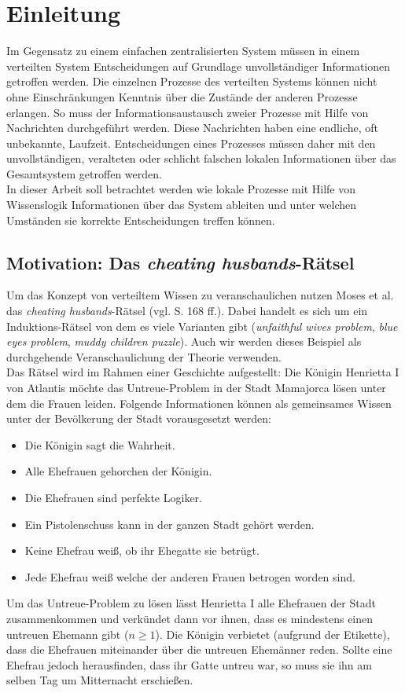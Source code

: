 \section{Einleitung}
Im Gegensatz zu einem einfachen zentralisierten System müssen in einem verteilten System Entscheidungen auf Grundlage unvollständiger Informationen getroffen werden.
Die einzelnen Prozesse des verteilten Systems können nicht ohne Einschränkungen Kenntnis über die Zustände der anderen Prozesse erlangen.
So muss der Informationsaustausch zweier Prozesse mit Hilfe von Nachrichten durchgeführt werden. Diese Nachrichten haben eine endliche, oft unbekannte, Laufzeit.
Entscheidungen eines Prozesses müssen daher mit den unvollständigen, veralteten oder schlicht falschen lokalen Informationen über das Gesamtsystem getroffen werden.\\
In dieser Arbeit soll betrachtet werden wie lokale Prozesse mit Hilfe von Wissenslogik Informationen über das System ableiten und unter welchen Umständen sie korrekte Entscheidungen treffen können.

\subsection{Motivation: Das \textit{cheating husbands}-Rätsel}
\label{motivation}
Um das Konzept von verteiltem Wissen zu veranschaulichen nutzen Moses et al. \cite{moses1986cheating} das \textit{cheating husbands}-Rätsel (vgl. \cite{moses1986cheating} S. 168 ff.).
Dabei handelt es sich um ein Induktions-Rätsel von dem es viele Varianten gibt (\textit{unfaithful wives problem}, \textit{blue eyes problem}, \textit{muddy children puzzle}). Auch wir werden dieses Beispiel als durchgehende Veranschaulichung der Theorie verwenden.\\
Das Rätsel wird im Rahmen einer Geschichte aufgestellt: Die Königin Henrietta I von Atlantis möchte das Untreue-Problem in der Stadt Mamajorca lösen unter dem die Frauen leiden.
Folgende Informationen können als gemeinsames Wissen unter der Bevölkerung der Stadt vorausgesetzt werden:
\begin{itemize}
	\item Die Königin sagt die Wahrheit.
	\item Alle Ehefrauen gehorchen der Königin.
	\item Die Ehefrauen sind perfekte Logiker.
	\item Ein Pistolenschuss kann in der ganzen Stadt gehört werden.
	\item Keine Ehefrau weiß, ob ihr Ehegatte sie betrügt.
	\item Jede Ehefrau weiß welche der anderen Frauen betrogen worden sind.
\end{itemize}
Um das Untreue-Problem zu lösen lässt Henrietta I alle Ehefrauen der Stadt zusammenkommen und verkündet dann vor ihnen, dass es mindestens einen untreuen Ehemann gibt ($n \ge 1$).
Die Königin verbietet (aufgrund der Etikette), dass die Ehefrauen miteinander über die untreuen Ehemänner reden.
Sollte eine Ehefrau jedoch herausfinden, dass ihr Gatte untreu war, so muss sie ihn am selben Tag um Mitternacht erschießen.\medskip

